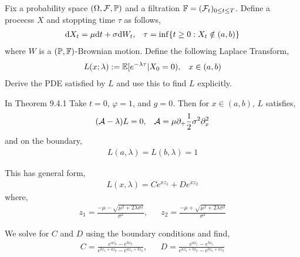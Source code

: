 \begin{problem}
    Fix a probability space \( (\Omega,\mathcal{F},\mathbb{P}) \) and a filtration \( \mathbb{F} = (\mathcal{F}_t)_{0\leq t\leq T} \). Define a procecss \( X \) and stoppting time \( \tau \) as follows,
    \begin{align*}
        \mathrm{d} X_t = \mu \mathrm{d} t + \sigma \mathrm{d} W_t, && \tau = \inf\{t\geq 0: X_t\notin(a,b)\}
    \end{align*}
    where \( W \) is a \( (\mathbb{P},\mathbb{F}) \)-Brownian motion. Define the following Laplace Transform,
    \begin{align*}
        L(x;\lambda) := \mathbb{E}[e^{-\lambda \tau} | X_0 = 0), && x\in(a,b)
    \end{align*}
    Derive the PDE satisfied by \( L \) and use this to find \( L \) explicitly.
\end{problem}

\begin{solution}[Solution]

    In Theorem 9.4.1 Take \( t=0 \), \( \varphi=1 \), and \( g = 0 \). Then for \( x\in(a,b) \), \( L \) satisfies,
    \begin{align*}
        (\mathcal{A} - \lambda) L = 0, && \mathcal{A} = \mu \partial_ + \frac{1}{2}\sigma^2\partial_x^2
    \end{align*}
    and on the boundary,
    \begin{align*}
        L(a,\lambda) = L(b,\lambda) = 1
    \end{align*}
    

This has general form,
\begin{align*}
    L(x,\lambda) = C e^{x z_1} + D e^{x z_2}
\end{align*}
where,
\begin{align*}
    z_1 = \frac{-\mu - \sqrt{\mu^2+2\lambda \sigma^2}}{\sigma^2}
    ,&&
    z_2 = \frac{-\mu + \sqrt{\mu^2+2\lambda \sigma^2}}{\sigma^2}
\end{align*}

We solve for \( C \) and \( D \) using the boundary conditions and find,
\begin{align*}
    C = \frac{e^{a z_2} - e^{b z_2}}{e^{bz_1+az_2}-e^{az_1+bz_2}}
    ,&&
    D = \frac{e^{a z_1} - e^{b z_1}}{e^{az_1+bz_2}-e^{bz_1+az_2}}
\end{align*}



\end{solution}




